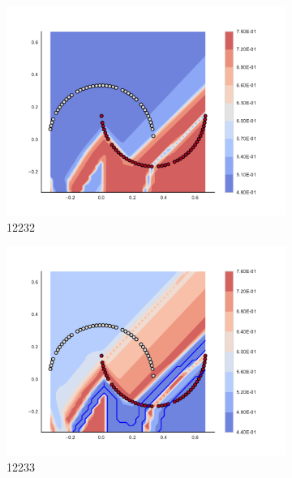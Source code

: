 \begin{figure}[h]
\begin{subfigure}[b]{0.09\textwidth}
    \includegraphics[clip, trim=2.35cm 1.75cm 4.5cm 0cm,width=\textwidth]{img/convergence/12232.pdf}
    \caption{12232}
    \label{fig:convergence_12232}
\end{subfigure}
%
\begin{subfigure}[b]{0.09\textwidth}
    \includegraphics[clip, trim=2.35cm 1.75cm 4.5cm 0cm,width=\textwidth]{img/convergence/12233.pdf}
    \caption{12233}
    \label{fig:convergence_12233}
\end{subfigure}
%
\begin{subfigure}[b]{0.09\textwidth}

\end{subfigure}
\end{figure}
